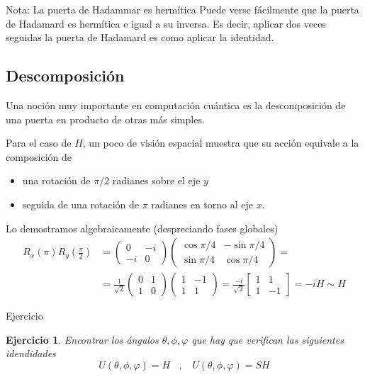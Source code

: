 \documentclass[a4paper,11pt]{book} %
\newtheorem{ejercicio_contador}{Ejercicio}
\newcommand{\Ejercicio}[1]{
		\begin{mybox_gray}{Ejercicio} 
			\begin{ejercicio_contador}
				 #1 
			\end{ejercicio_contador} 
		\end{mybox_gray}
	}
\numberwithin{equation}{chapter}
\def\lp{\left(}
\def\rp{\right)}
\begin{document}
	\begin{mybox_blue}{Nota: La puerta de Hadammar es hermítica}
	Puede verse fácilmente que la puerta de Hadamard es hermítica e igual a su inversa. Es decir, aplicar
	dos veces seguidas la puerta de Hadamard es como aplicar la identidad.
	\end{mybox_blue}


        \subsection{Descomposición}
        
Una noción muy importante en computación cuántica es la descomposición de una puerta en producto de otras más simples. 

Para el caso de $H$, un poco de visión espacial muestra que su acción equivale a la composición de
\begin{itemize}
	\item una  rotación de $\pi/2$ radianes sobre el eje $y$ 
	\item seguida de una rotación de  $\pi$ radianes en torno al eje $x$.
\end{itemize}
Lo demostramos algebraicamente (despreciando fases globales)       
	\begin{align*}
	R_x(\pi)R_{y}\left(\frac{\pi}{2}\right) & = 
	\lp \begin{matrix}0&-i\\-i&0\end{matrix}  \rp
	\lp \begin{matrix}\cos\pi/4& -\sin\pi/4 \\ \sin\pi/4 & \cos\pi/4 \end{matrix} \rp = \\
	& = \frac{1}{\sqrt{2}} \lp \begin{matrix} 0&1 \\ 1&0 \end{matrix} \rp 
	\lp \begin{matrix}1 & -1 \\ 1 & 1 \end{matrix} \rp  =
	 \frac{-i}{\sqrt{2}} \begin{bmatrix}1&1\\1&-1\end{bmatrix} =-i H \sim H
	\end{align*}

	\Ejercicio{Encontrar los ángulos $\theta,\phi,\varphi$ que hay que verifican las siguientes idendidades
	 $$
	 U(\theta,\phi,\varphi) = H ~~~~,~~~~  U(\theta,\phi,\varphi) = SH
	 $$}
\end{document}
